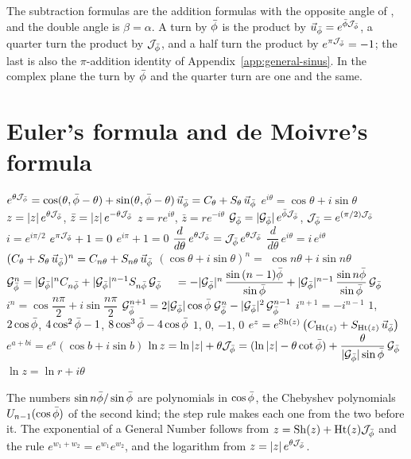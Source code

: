 The subtraction formulas are the addition formulas with the opposite angle of , and the double angle is $\beta = \alpha$. A turn by $\bar{\phi}$ is the product by $\vec{u}_{\bar{\phi}} = e^{\bar{\phi}\mathcal{J}_{\bar{\phi}}}$, a quarter turn the product by $\mathcal{J}_{\bar{\phi}}$, and a half turn the product by $e^{\pi\mathcal{J}_{\bar{\phi}}} = -1$; the last is also the $\pi$-addition identity of Appendix~\ref{app:general-sinus}. In the complex plane the turn by $\bar{\phi}$ and the quarter turn are one and the same.

\section{Euler's formula and de Moivre's formula}\label{app:f-euler}

\begin{gnlaws}
  {$e^{\theta\mathcal{J}_{\bar{\phi}}} = \cos(\theta, \bar{\phi} - \theta) + \sin(\theta, \bar{\phi} - \theta)\,\vec{u}_{\bar{\phi}} = C_\theta + S_\theta\,\vec{u}_{\bar{\phi}}$}
  {$e^{i\theta} = \cos\theta + i\sin\theta$}
  {$z = |z|\,e^{\theta\mathcal{J}_{\bar{\phi}}}$, \quad $\bar{z} = |z|\,e^{-\theta\mathcal{J}_{\bar{\phi}}}$}
  {$z = re^{i\theta}$, \quad $\bar{z} = re^{-i\theta}$}
  {$\mathcal{G}_{\bar{\phi}} = |\mathcal{G}_{\bar{\phi}}|\,e^{\bar{\phi}\mathcal{J}_{\bar{\phi}}}$, \quad $\mathcal{J}_{\bar{\phi}} = e^{(\pi/2)\mathcal{J}_{\bar{\phi}}}$}
  {$i = e^{i\pi/2}$}
  {$e^{\pi\mathcal{J}_{\bar{\phi}}} + 1 = 0$}
  {$e^{i\pi} + 1 = 0$}
  {$\dfrac{d}{d\theta}\,e^{\theta\mathcal{J}_{\bar{\phi}}} = \mathcal{J}_{\bar{\phi}}\,e^{\theta\mathcal{J}_{\bar{\phi}}}$}
  {$\dfrac{d}{d\theta}\,e^{i\theta} = i\,e^{i\theta}$}
  {$(C_\theta + S_\theta\,\vec{u}_{\bar{\phi}})^n = C_{n\theta} + S_{n\theta}\,\vec{u}_{\bar{\phi}}$}
  {$(\cos\theta + i\sin\theta)^n = {}$ \newline $\cos n\theta + i\sin n\theta$}
  {$\mathcal{G}_{\bar{\phi}}^n = |\mathcal{G}_{\bar{\phi}}|^n C_{n\bar{\phi}} + |\mathcal{G}_{\bar{\phi}}|^{n-1}S_{n\bar{\phi}}\,\mathcal{G}_{\bar{\phi}}$ \newline $\quad = -|\mathcal{G}_{\bar{\phi}}|^n\,\dfrac{\sin\,(n - 1)\bar{\phi}}{\sin\bar{\phi}} + |\mathcal{G}_{\bar{\phi}}|^{n-1}\,\dfrac{\sin n\bar{\phi}}{\sin\bar{\phi}}\,\mathcal{G}_{\bar{\phi}}$}
  {$i^n = \cos\dfrac{n\pi}{2} + i\sin\dfrac{n\pi}{2}$}
  {$\mathcal{G}_{\bar{\phi}}^{n+1} = 2|\mathcal{G}_{\bar{\phi}}|\cos\bar{\phi}\;\mathcal{G}_{\bar{\phi}}^n - |\mathcal{G}_{\bar{\phi}}|^2\,\mathcal{G}_{\bar{\phi}}^{n-1}$}
  {$i^{n+1} = -i^{n-1}$}
  {$1$, \quad $2\cos\bar{\phi}$, \quad $4\cos^2\bar{\phi} - 1$, \quad $8\cos^3\bar{\phi} - 4\cos\bar{\phi}$}
  {$1$, \quad $0$, \quad $-1$, \quad $0$}
  {$e^z = e^{\operatorname{Sh}(z)}\,\bigl(C_{\operatorname{Ht}(z)} + S_{\operatorname{Ht}(z)}\,\vec{u}_{\bar{\phi}}\bigr)$}
  {$e^{a + bi} = e^a(\cos b + i\sin b)$}
  {$\ln z = \ln|z| + \theta\mathcal{J}_{\bar{\phi}} = (\ln|z| - \theta\cot\bar{\phi}) + \dfrac{\theta}{|\mathcal{G}_{\bar{\phi}}|\sin\bar{\phi}}\,\mathcal{G}_{\bar{\phi}}$}
  {$\ln z = \ln r + i\theta$}
\end{gnlaws}
The numbers $\sin n\bar{\phi}/\sin\bar{\phi}$ are polynomials in $\cos\bar{\phi}$, the Chebyshev polynomials $U_{n-1}(\cos\bar{\phi})$ of the second kind; the step rule makes each one from the two before it. The exponential of a General Number follows from $z = \operatorname{Sh}(z) + \operatorname{Ht}(z)\mathcal{J}_{\bar{\phi}}$ and the rule $e^{w_1 + w_2} = e^{w_1}e^{w_2}$, and the logarithm from $z = |z|\,e^{\theta\mathcal{J}_{\bar{\phi}}}$.

